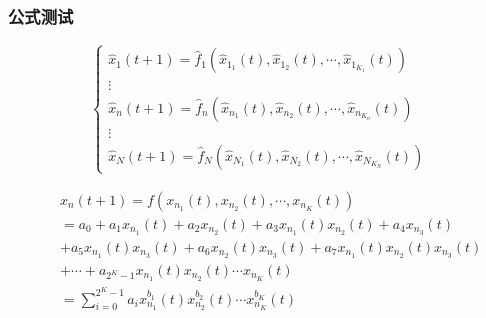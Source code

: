 \subsubsection{公式测试}
\begin{small}
	\begin{equation}
		\left\{
		\begin{array}{*{20}{c}}\label{E2}
			{{\hat{x}_1}\left( {t + 1} \right) = {\hat{f}_{1}}\left( {{\hat{x}_{1_{1}}}\left( t \right),{\hat{x}_{1_{2}}}\left( t \right), \cdots ,{\hat{x}_{{1_{K_1}}}}\left( t \right)} \right)}\\
			\vdots \\
			{{\hat{x}_n}\left( {t + 1} \right) = {\hat{f}_{n}}\left( {{\hat{x}_{n_{1}}}\left( t \right),{\hat{x}_{n_{2}}}\left( t \right), \cdots ,{\hat{x}_{{n_{K_n}}}}\left( t \right)} \right)}\\
			\vdots \\
			{{\hat{x}_N}\left( {t + 1} \right)   = {\hat{f}_{N}}\left( {{\hat{x}_{N_{1}}}\left( t \right),{\hat{x}_{N_{2}}}\left( t \right), \cdots ,{\hat{x}_{{N_{K_N}}}}\left( t \right)} \right)}
		\end{array}
		\right.
	\end{equation}
	
	\begin{eqnarray}
		&&x_{n}(t+1)= f\left ( x_{n_1}(t), x_{n_2}(t),\cdots, x_{n_K}(t) \right )\nonumber\\
		&&= a_{0}+a_{1}x_{n_1}(t)+a_{2}x_{n_2}(t)+a_{3}x_{n_1}(t)x_{n_2}(t)+a_{4}x_{n_3}(t)\nonumber\\
		&&+a_{5}x_{n_1}(t)x_{n_3}(t)+a_{6}x_{n_2}(t)x_{n_3}(t)+a_{7}x_{n_1}(t)x_{n_2}(t)x_{n_3}(t)\nonumber\\
		&&+\cdots+a_{2^K-1}x_{n_1}(t)x_{n_2}(t)\cdots x_{n_{K}}(t)\nonumber\\
		&&=\sum_{i=0}^{2^K-1} a_{i}x_{n_{1}}^{b_{1}}(t) x_{n_2}^{b_2}(t) \cdots x_{n_{K}}^{b_{K}}(t)   \label{En}
	\end{eqnarray}
	

\end{small}
